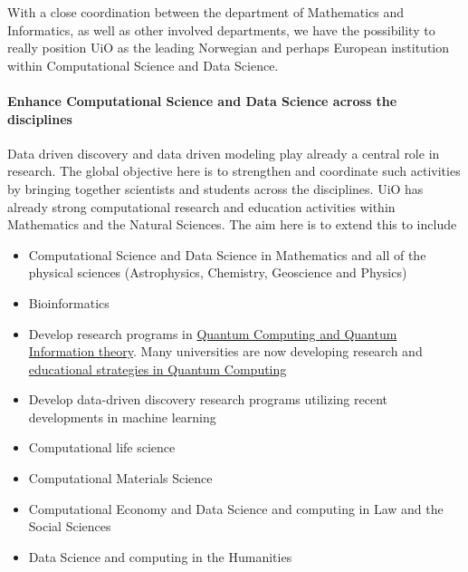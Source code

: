 \documentclass[]{article}
\providecommand{\tightlist}{%
  \setlength{\itemsep}{0pt}\setlength{\parskip}{0pt}}
\let\oldparagraph\paragraph
\renewcommand{\paragraph}[1]{\oldparagraph{#1}\mbox{}}
\begin{document}
With a close coordination between the department of Mathematics and
Informatics, as well as other involved departments, we have the
possibility to really position UiO as the leading Norwegian and perhaps
European institution within Computational Science and Data Science.

\hypertarget{enhance-computational-science-and-data-science-across-the-disciplines}{%
\paragraph{Enhance Computational Science and Data Science across the
disciplines}\label{enhance-computational-science-and-data-science-across-the-disciplines}}

Data driven discovery and data driven modeling play already a central
role in research. The global objective here is to strengthen and
coordinate such activities by bringing together scientists and students
across the disciplines. UiO has already strong computational research
and education activities within Mathematics and the Natural Sciences.
The aim here is to extend this to include

\begin{itemize}
\tightlist
\item
  Computational Science and Data Science in Mathematics and all of the
  physical sciences (Astrophysics, Chemistry, Geoscience and Physics)
\item
  Bioinformatics
\item
  Develop research programs in
  \href{https://www.aps.org/publications/apsnews/201802/ostp.cfm?utm_source=APS+Physics+Main+Group\&utm_campaign=fb7a2e7d6b-News+021218\&utm_medium=email\&utm_term=0_825303224b-fb7a2e7d6b-106513221}{Quantum
  Computing and Quantum Information theory}. Many universities are now
  developing research and
  \href{https://vprgs.msu.edu/event/interdisciplinary-forum-quantum-information-science}{educational
  strategies in Quantum Computing}
\item
  Develop data-driven discovery research programs utilizing recent
  developments in machine learning
\item
  Computational life science
\item
  Computational Materials Science
\item
  Computational Economy and Data Science and computing in Law and the
  Social Sciences
\item
  Data Science and computing in the Humanities
\end{itemize}
\end{document}
